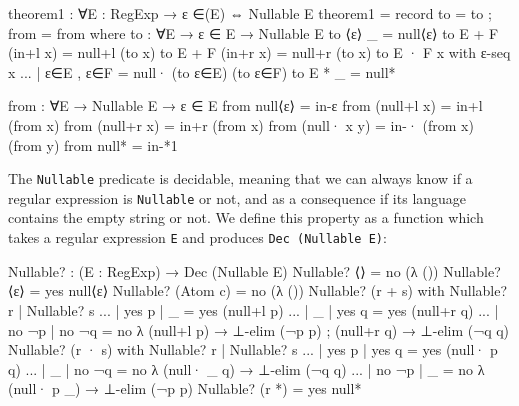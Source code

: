 \begin{agda}
theorem1 : ∀{E : RegExp}
  → ε ∈(E) ⇔ Nullable E
theorem1 = record { to = to ; from = from }
  where
    to : ∀{E} → ε ∈ E → Nullable E
    to {⟨ε⟩} _          = null⟨ε⟩
    to {E + F} (in+l x) = null+l (to x)
    to {E + F} (in+r x) = null+r (to x)
    to {E · F} x with ε-seq x
    ... | ε∈E , ε∈F     = null· (to ε∈E) (to ε∈F)
    to {E *} _          = null*

    from : ∀{E} → Nullable E → ε ∈ E
    from null⟨ε⟩     = in-ε
    from (null+l x)  = in+l (from x)
    from (null+r x)  = in+r (from x)
    from (null· x y) = in-· (from x) (from y)
    from null*       = in-*1
\end{agda}
The \texttt{Nullable} predicate is decidable, meaning that we can always know if a regular expression is \texttt{Nullable} or not, and as a consequence if its language contains the empty string or not. We define this property as a function which takes a regular expression \texttt{E} and produces \texttt{Dec (Nullable E)}:
\begin{agda}
Nullable? : (E : RegExp) → Dec (Nullable E)
Nullable? ⟨⟩ = no (λ ())
Nullable? ⟨ε⟩ = yes null⟨ε⟩
Nullable? (Atom c) = no (λ ())
Nullable? (r + s) with Nullable? r | Nullable? s
... | yes p | _     = yes (null+l p)
... | _     | yes q = yes (null+r q)
... | no ¬p | no ¬q = no λ{ (null+l p) → ⊥-elim (¬p p)
                          ; (null+r q) → ⊥-elim (¬q q) } 
Nullable? (r · s)  with Nullable? r | Nullable? s
... | yes p | yes q = yes (null· p q)
... | _     | no ¬q = no λ{ (null· _ q) → ⊥-elim (¬q q) }
... | no ¬p | _     = no λ{ (null· p _) → ⊥-elim (¬p p) }
Nullable? (r *) = yes null*
\end{agda}

